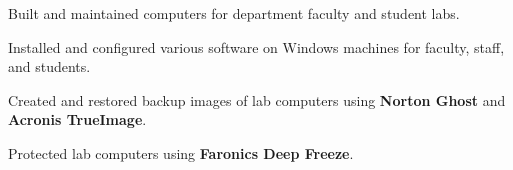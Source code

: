 


\begin{rExperience}

  \item Built and maintained computers for department faculty and student labs.

  \item Installed and configured various software on Windows machines for faculty, staff, and students.

  \item Created and restored backup images of lab computers using \textbf{Norton Ghost} and \textbf{Acronis TrueImage}.

  \item Protected lab computers using \textbf{Faronics Deep Freeze}.

\end{rExperience}
